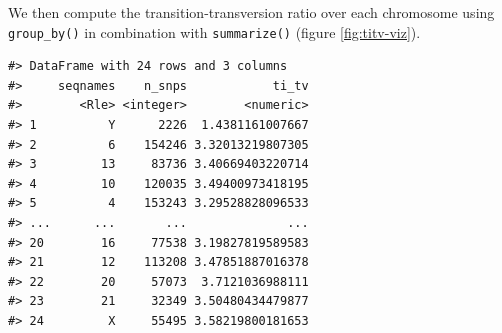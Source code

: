 \documentclass[]{article}
\newenvironment{Shaded}{\begin{snugshade}}{\end{snugshade}}
\newcommand{\KeywordTok}[1]{\textcolor[rgb]{0.13,0.29,0.53}{\textbf{#1}}}
\newcommand{\DataTypeTok}[1]{\textcolor[rgb]{0.13,0.29,0.53}{#1}}
\newcommand{\StringTok}[1]{\textcolor[rgb]{0.31,0.60,0.02}{#1}}
\newcommand{\OperatorTok}[1]{\textcolor[rgb]{0.81,0.36,0.00}{\textbf{#1}}}
\newcommand{\NormalTok}[1]{#1}
\begin{document}
\begin{Shaded}
\end{Shaded}

We then compute the transition-transversion ratio over each chromosome
using \texttt{group\_by()} in combination with \texttt{summarize()}
(figure \ref{fig:titv-viz}).

\begin{Shaded}
\end{Shaded}

\begin{verbatim}
#> DataFrame with 24 rows and 3 columns
#>     seqnames    n_snps            ti_tv
#>        <Rle> <integer>        <numeric>
#> 1          Y      2226  1.4381161007667
#> 2          6    154246 3.32013219807305
#> 3         13     83736 3.40669403220714
#> 4         10    120035 3.49400973418195
#> 5          4    153243 3.29528828096533
#> ...      ...       ...              ...
#> 20        16     77538 3.19827819589583
#> 21        12    113208 3.47851887016378
#> 22        20     57073  3.7121036988111
#> 23        21     32349 3.50480434479877
#> 24         X     55495 3.58219800181653
\end{verbatim}
\end{document}
